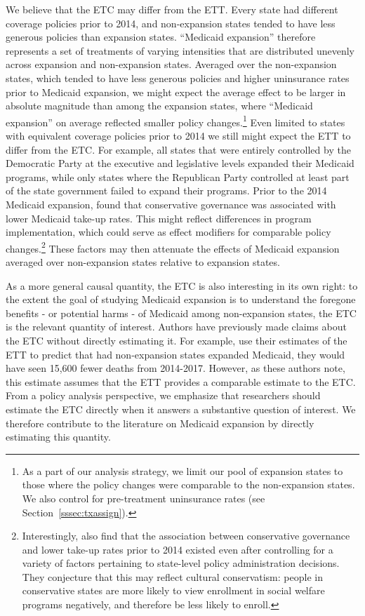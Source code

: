 \documentclass[aoas]{imsart}
\theoremstyle{plain}
\theoremstyle{remark}
\begin{document}
We believe that the ETC may differ from the ETT. Every state had different coverage policies prior to 2014, and non-expansion states tended to have less generous policies than expansion states. ``Medicaid expansion'' therefore represents a set of treatments of varying intensities that are distributed unevenly across expansion and non-expansion states. Averaged over the non-expansion states, which tended to have less generous policies and higher uninsurance rates prior to Medicaid expansion, we might expect the average effect to be larger in absolute magnitude than among the expansion states, where ``Medicaid expansion'' on average reflected smaller policy changes.\footnote{As a part of our analysis strategy, we limit our pool of expansion states to those where the policy changes were comparable to the non-expansion states. We also control for pre-treatment uninsurance rates (see Section~\ref{sssec:txassign}).} Even limited to states with equivalent coverage policies prior to 2014 we still might expect the ETT to differ from the ETC. For example, all states that were entirely controlled by the Democratic Party at the executive and legislative levels expanded their Medicaid programs, while only states where the Republican Party controlled at least part of the state government failed to expand their programs. Prior to the 2014 Medicaid expansion, \cite{sommers2012understanding} found that conservative governance was associated with lower Medicaid take-up rates. This might reflect differences in program implementation, which could serve as effect modifiers for comparable policy changes.\footnote{Interestingly, \cite{sommers2012understanding} also find that the association between conservative governance and lower take-up rates prior to 2014 existed even after controlling for a variety of factors pertaining to state-level policy administration decisions. They conjecture that this may reflect cultural conservatism: people in conservative states are more likely to view enrollment in social welfare programs negatively, and therefore be less likely to enroll.} These factors may then attenuate the effects of Medicaid expansion averaged over non-expansion states relative to expansion states.

As a more general causal quantity, the ETC is also interesting in its own right: to the extent the goal of studying Medicaid expansion is to understand the foregone benefits - or potential harms - of Medicaid among non-expansion states, the ETC is the relevant quantity of interest. Authors have previously made claims about the ETC without directly estimating it. For example, \cite{miller2019medicaid} use their estimates of the ETT to predict that had non-expansion states expanded Medicaid, they would have seen 15,600 fewer deaths from 2014-2017. However, as these authors note, this estimate assumes that the ETT provides a comparable estimate to the ETC. From a policy analysis perspective, we emphasize that researchers should estimate the ETC directly when it answers a substantive question of interest. We therefore contribute to the literature on Medicaid expansion by directly estimating this quantity.
\end{document}
